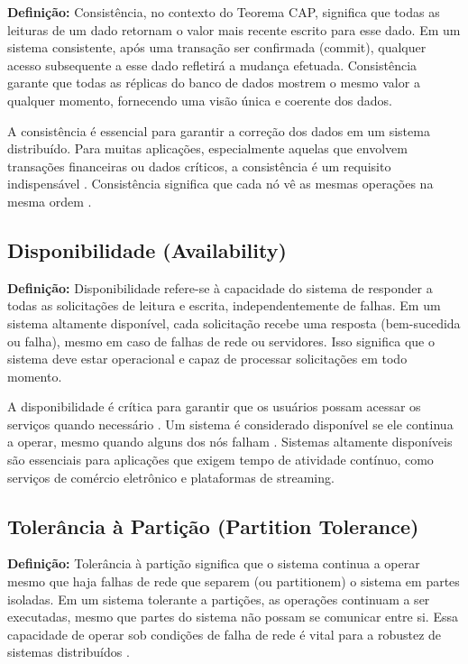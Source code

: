 \textbf{Definição:} Consistência, no contexto do Teorema CAP, significa que todas as leituras de um dado retornam o valor mais recente escrito para esse dado. Em um sistema consistente, após uma transação ser confirmada (commit), qualquer acesso subsequente a esse dado refletirá a mudança efetuada. Consistência garante que todas as réplicas do banco de dados mostrem o mesmo valor a qualquer momento, fornecendo uma visão única e coerente dos dados.

A consistência é essencial para garantir a correção dos dados em um sistema distribuído. Para muitas aplicações, especialmente aquelas que envolvem transações financeiras ou dados críticos, a consistência é um requisito indispensável \cite{brewer2000}. Consistência significa que cada nó vê as mesmas operações na mesma ordem \cite{brewer2000}.
\subsection{Disponibilidade (Availability)}

\textbf{Definição:} Disponibilidade refere-se à capacidade do sistema de responder a todas as solicitações de leitura e escrita, independentemente de falhas. Em um sistema altamente disponível, cada solicitação recebe uma resposta (bem-sucedida ou falha), mesmo em caso de falhas de rede ou servidores. Isso significa que o sistema deve estar operacional e capaz de processar solicitações em todo momento.

A disponibilidade é crítica para garantir que os usuários possam acessar os serviços quando necessário \cite{brewer2000}. Um sistema é considerado disponível se ele continua a operar, mesmo quando alguns dos nós falham \cite{brewer2000}. Sistemas altamente disponíveis são essenciais para aplicações que exigem tempo de atividade contínuo, como serviços de comércio eletrônico e plataformas de streaming.

\subsection{Tolerância à Partição (Partition Tolerance)}
\textbf{Definição:} Tolerância à partição significa que o sistema continua a operar mesmo que haja falhas de rede que separem (ou partitionem) o sistema em partes isoladas. Em um sistema tolerante a partições, as operações continuam a ser executadas, mesmo que partes do sistema não possam se comunicar entre si. Essa capacidade de operar sob condições de falha de rede é vital para a robustez de sistemas distribuídos \cite{brewer2000}.

